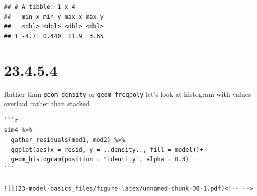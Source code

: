 \documentclass[]{book}
\newenvironment{Shaded}{\begin{snugshade}}{\end{snugshade}}
\newcommand{\DataTypeTok}[1]{\textcolor[rgb]{0.13,0.29,0.53}{#1}}
\newcommand{\DecValTok}[1]{\textcolor[rgb]{0.00,0.00,0.81}{#1}}
\newcommand{\KeywordTok}[1]{\textcolor[rgb]{0.13,0.29,0.53}{\textbf{#1}}}
\newcommand{\NormalTok}[1]{#1}
\newcommand{\OperatorTok}[1]{\textcolor[rgb]{0.81,0.36,0.00}{\textbf{#1}}}
\newcommand{\StringTok}[1]{\textcolor[rgb]{0.31,0.60,0.02}{#1}}
\theoremstyle{definition}
\theoremstyle{definition}
\theoremstyle{definition}
\theoremstyle{remark}
\begin{document}
\begin{Shaded}
\end{Shaded}

\begin{verbatim}
## # A tibble: 1 x 4
##   min_x min_y max_x max_y
##   <dbl> <dbl> <dbl> <dbl>
## 1 -4.71 0.440  11.9  3.65
\end{verbatim}

\hypertarget{section-81}{%
\section{23.4.5.4}\label{section-81}}

Rather than \texttt{geom\_density} or \texttt{geom\_freqpoly} let's look
at histogram with values overlaid rather than stacked.

\begin{verbatim}
```r
sim4 %>% 
  gather_residuals(mod1, mod2) %>% 
  ggplot(aes(x = resid, y = ..density.., fill = model))+
  geom_histogram(position = "identity", alpha = 0.3)
```

![](23-model-basics_files/figure-latex/unnamed-chunk-30-1.pdf)<!-- --> 
\end{verbatim}
\end{document}
